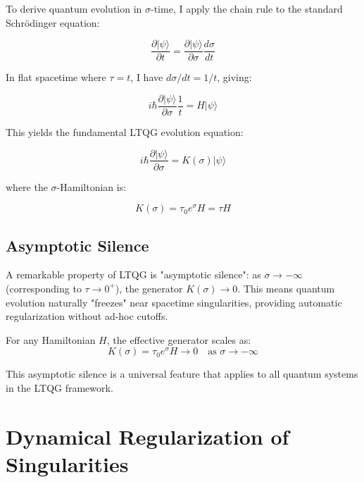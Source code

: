 \documentclass[12pt,a4paper]{article}
\begin{document}
To derive quantum evolution in $\sigma$-time, I apply the chain rule to the standard Schrödinger equation:

\begin{equation}
\frac{\partial |\psi\rangle}{\partial t} = \frac{\partial |\psi\rangle}{\partial \sigma} \frac{d\sigma}{dt}
\end{equation}

In flat spacetime where $\tau = t$, I have $d\sigma/dt = 1/t$, giving:

\begin{equation}
i\hbar \frac{\partial |\psi\rangle}{\partial \sigma} \frac{1}{t} = H |\psi\rangle
\end{equation}

This yields the fundamental LTQG evolution equation:

\begin{equation}
\boxed{i\hbar \frac{\partial |\psi\rangle}{\partial \sigma} = K(\sigma) |\psi\rangle}
\label{eq:ltqg_schrodinger}
\end{equation}

where the $\sigma$-Hamiltonian is:

\begin{equation}
\boxed{K(\sigma) = \tau_0 e^{\sigma} H = \tau H}
\label{eq:sigma_hamiltonian}
\end{equation}

\subsection{Asymptotic Silence}

A remarkable property of LTQG is "asymptotic silence": as $\sigma \to -\infty$ (corresponding to $\tau \to 0^+$), the generator $K(\sigma) \to 0$. This means quantum evolution naturally "freezes" near spacetime singularities, providing automatic regularization without ad-hoc cutoffs.

For any Hamiltonian $H$, the effective generator scales as:
\begin{equation}
K(\sigma) = \tau_0 e^{\sigma} H \to 0 \quad \text{as } \sigma \to -\infty
\label{eq:asymptotic_silence}
\end{equation}

This asymptotic silence is a universal feature that applies to all quantum systems in the LTQG framework.

\section{Dynamical Regularization of Singularities}
\end{document}

